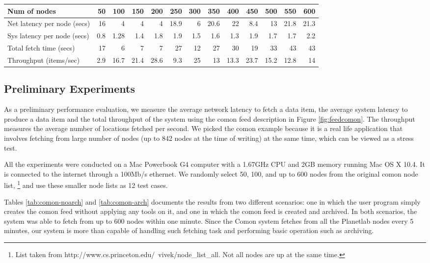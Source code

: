 \begin{table*}
\begin{center}
\begin{tabular}{|l|r|r|r|r|r|r|r|r|r|r|r|r|}\hline
Num of nodes&	50&	100&	150&	200&	250&	300&	350&	400&	450&	500&	550&	600 \\ \hline\hline
Net latency per node (secs)&	16&	4&	4&	4&	18.9&	6&	20.6&	22&	8.4&	13&	21.8&	21.3 \\ \hline
Sys latency per node (secs)&	0.8&	1.28&	1.4&	1.8&	1.9&	1.5&	1.6&	1.3&	1.9&	1.7&	1.7&	2.2 \\ \hline
Total fetch time (secs)&	17&	6&	7&	7&	27&	12&	27&	30&	19&	33&	43&	43 \\ \hline
Throughput (items/sec)&	2.9&	16.7&	21.4&	28.6&	9.3&	25&	13&	13.3&	23.7&	15.2&	12.8&	14 \\ \hline
\end{tabular}
\end{center}
\caption{Performance of Comon with archiving}
\label{tab:comon-arch}
\end{table*}

\subsection{Preliminary Experiments}
As a preliminary performance evaluation, 
we measure the average network latency
to fetch a data item, the average system latency 
to produce a data item
and the total throughput of the system using the comon feed
description in Figure \ref{fig:feedcomon}. 
The throughput measures the average
number of locations fetched per second. We picked
the comon example because it is a real life
application that involves fetching from large number of 
nodes (up to 842 nodes at the time of writing)
at the same time, which can be viewed as a stress test. 

All the experiments were conducted on a Mac Powerbook G4 computer
with a 1.67GHz CPU and 2GB memory running Mac OS X 10.4. It is
connected to the internet through a 100Mb/s ethernet. 
We randomly select 50, 100, and up to 600 nodes from the 
original comon node list, 
\footnote{List taken from http://www.cs.princeton.edu/~vivek/node\_list\_all. 
Not all nodes are up at the same time.}
and use these smaller node lists as 12 test cases. 

Tables \ref{tab:comon-noarch} and \ref{tab:comon-arch}
documents the results from two different scenarios:
one in which the user program simply creates the comon feed without applying
any tools on it, and one in which the comon feed is created
and archived. In both scenarios, the system was
able to fetch from up to 600 nodes within one minute.
Since the Comon system fetches from all the Planetlab nodes every
5 minutes, our system is more than capable of handling such fetching
task and performing basic operation such as archiving.


